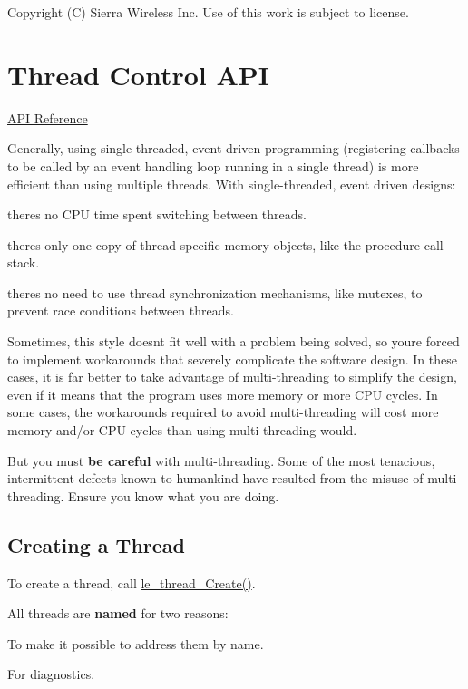 Copyright (C) Sierra Wireless Inc. Use of this work is subject to license. \hypertarget{c_threading}{}\section{Thread Control A\+P\+I}\label{c_threading}
\hyperlink{le__thread_8h}{A\+P\+I Reference}





Generally, using single-\/threaded, event-\/driven programming (registering callbacks to be called by an event handling loop running in a single thread) is more efficient than using multiple threads. With single-\/threaded, event driven designs\+:
\begin{DoxyItemize}
\item there\textquotesingle{}s no C\+P\+U time spent switching between threads.
\item there\textquotesingle{}s only one copy of thread-\/specific memory objects, like the procedure call stack.
\item there\textquotesingle{}s no need to use thread synchronization mechanisms, like mutexes, to prevent race conditions between threads.
\end{DoxyItemize}

Sometimes, this style doesn\textquotesingle{}t fit well with a problem being solved, so you\textquotesingle{}re forced to implement workarounds that severely complicate the software design. In these cases, it is far better to take advantage of multi-\/threading to simplify the design, even if it means that the program uses more memory or more C\+P\+U cycles. In some cases, the workarounds required to avoid multi-\/threading will cost more memory and/or C\+P\+U cycles than using multi-\/threading would.

But you must {\bfseries  be careful } with multi-\/threading. Some of the most tenacious, intermittent defects known to humankind have resulted from the misuse of multi-\/threading. Ensure you know what you are doing.\hypertarget{c_threading_threadCreating}{}\subsection{Creating a Thread}\label{c_threading_threadCreating}
To create a thread, call {\ttfamily \hyperlink{le__thread_8h_a87e02a46f92e9e3e11ed28a2b265872f}{le\+\_\+thread\+\_\+\+Create()}}.

All threads are {\bfseries named} for two reasons\+:
\begin{DoxyEnumerate}
\item To make it possible to address them by name.
\item For diagnostics.
\end{DoxyEnumerate}


